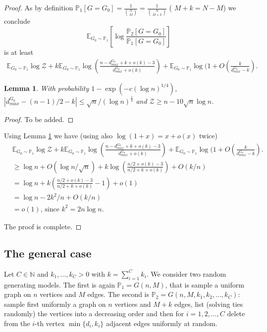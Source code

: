\documentclass[12pt,a4paper]{article}
\numberwithin{equation}{section}
\newtheorem{lemma}[theorem]{Lemma}
\numberwithin{equation}{section}
\newcommand{\1}{{\text{\Large $\mathfrak 1$}}}
\newcommand{\2}[1]{{\text{\Large $\mathfrak 1$}\!\left(#1\right)}}
\begin{document}
\begin{proof}
As by definition $\mathbb{P}_1[G=G_0]=\frac{1}{\binom{N}{M}}=\frac{1}{\binom{N}{M+k}}$ ( $M+k=N-M$) we conclude 
$$\mathbb{E}_{G_0 \sim \mathbb{P}_1} \left[ \log \frac{\mathbb{P}_2[G=G_0]}{\mathbb{P}_1[G=G_0]}  \right]$$is at least
\begin{align*}\mathbb{E}_{G_0 \sim \mathbb{P}_1} \log \mathcal{Z}+k\mathbb{E}_{G_0 \sim \mathbb{P}_1}\log \left(\frac{n-d^{G_0}_{max}+k+o(k)-3}{d^{G_0}_{max}+o(k)}\right)+\mathbb{E}_{G_0 \sim \mathbb{P}_1}\log (1+O(\frac{k}{d^{G_0}_{max}-k}).\end{align*} 


\begin{lemma}\label{lem}
With probability $1-\exp(-c(\log n)^{1/4})$, $|d^{G_0}_{max}-(n-1)/2-k| \leq \sqrt{n}/(\log n)^{\frac{1}{4}}$ and $ \mathcal{Z} \geq n-10 \sqrt{n} \log n$.
\end{lemma}


\begin{proof}
To be added. 
\end{proof}
Using Lemma \ref{lem} we have (using also $\log (1+x)=x+o(x)$ twice)
\begin{align*}
&\mathbb{E}_{G_0 \sim \mathbb{P}_1} \log \mathcal{Z}+k\mathbb{E}_{G_0 \sim \mathbb{P}_1}\log \left(\frac{n-d^{G_0}_{max}+k+o(k)-3}{d^{G_0}_{max}+o(k)}\right)+\mathbb{E}_{G_0 \sim \mathbb{P}_1}\log (1+O(\frac{k}{d^{G_0}_{max}-k}).\\
& \geq \log n+O(\log n/\sqrt{n})+k\log \left(\frac{n/2+o(k)-3}{n/2+k+o(k)}\right)+O(k/n)\\
&= \log n+k\left(\frac{n/2+o(k)-3}{n/2+k+o(k)}-1\right)+o(1)\\
&=\log n-2k^2/n+O(k/n) \\
&=o(1)\text{, since } k^2=2n\log n.
\end{align*}

The proof is complete.
\end{proof}


\subsection{The general case}


Let $C \in \mathbb{N}$ and $k_1,\ldots,k_C>0$ with $k=\sum_{i=1}^C k_i$.
We consider two random generating models. The first is again $\mathbb{P}_1=G(n,M)$, that is sample a uniform graph on $n$ vertices and $M$ edges. The second is $\mathbb{P}_2=G(n,M,k_1,k_2,\ldots,k_C)$: sample first uniformly a graph on $n$ vertices and $M+k$ edges, list (solving ties randomly) the vertices into a decreasing order and then for $i=1,2,\ldots,C$ delete from the $i$-th vertex $\min\{ d_i,k_i\}$ adjacent edges uniformly at random. 
\end{document}
